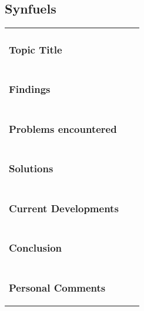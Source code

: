\documentclass[12pt,a4paper,numbers=noenddot]{scrartcl}
\begin{document}
\subsection{Synfuels}
\begin{xtabular}{|p{3.8cm}|p{8.3cm}|p{4.2cm}|}
	\vspace*{-1.25\baselineskip}\subsubsection{Topic Title}
	& 

	& 
	\\
	\vspace*{-1.25\baselineskip}\subsubsection{Findings}
	& 

	&
	\\
	\vspace*{-1.25\baselineskip}\subsubsection{Problems encountered}
	& 

	&
	\\
	\vspace*{-1.25\baselineskip}\subsubsection{Solutions}
	& 

	&
	\\
	\vspace*{-1.25\baselineskip}\subsubsection{Current Developments}
	& 
	
	&
	\\
	\vspace*{-1.25\baselineskip}\subsubsection{Conclusion}
	& 
	
	&
	\\
	\vspace*{-1.25\baselineskip}\subsubsection{Personal Comments}
	& 
	
	&
	\\
	\hline
\end{xtabular}
\end{document}
